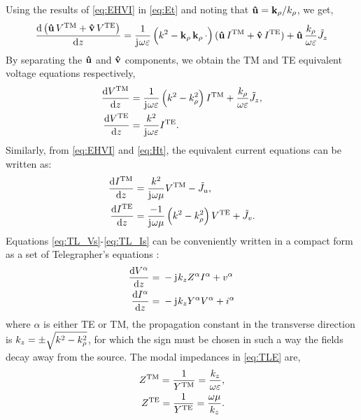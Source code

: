 \documentclass[12pt]{article}
\begin{document}
%
Using the results of \eqref{eq:EHVI} in \eqref{eq:Et} and noting that $\mathbf{\hat u} = \mathbf{k}_{\rho}/k_{\rho}$, we get,
%
\begin{equation}
  \dv{\left(\mathbf{\hat u} \, V^{\mathrm{TM}} + \mathbf{\hat v} \,V^{\mathrm{TE}} \right)}{z} = \frac{1}{\mathrm{j}\mkern1mu \omega \varepsilon}\left( k^2 - \mathbf{k}_{\rho} \,\mathbf{k}_{\rho}
  \,\cdot \right) (\mathbf{\hat u}\, I^{\mathrm{TM}} +
  \mathbf{\hat v} \, I^{\mathrm{TE}}) + \mathbf{\hat u} \, \frac{k_{\rho}}{\omega \varepsilon} \tilde{J}_z
  \label{eq:Vinuv}
\end{equation}
%
By separating the $\mathbf{\hat u}$ and $\mathbf{\hat v}$ components, we obtain the TM and TE equivalent voltage equations respectively,
%
\begin{subequations}
  \begin{align}
    \dv{V^{\mathrm{TM}}}{z} ={}&
    \frac{1}{\mathrm{j}\mkern1mu \omega \varepsilon}\left( k^2 - k_{\rho}^2 \right)I^{\mathrm{TM}} + \frac{k_{\rho}}{\omega \varepsilon} \tilde{J}_z,
    \label{eq:V_TM}\\
    \dv{V^{\mathrm{TE}}}{z} ={}&
    \frac{k^2}{\mathrm{j}\mkern1mu \omega \varepsilon} I^{\mathrm{TE}}.
    \label{eq:V_TE}
  \end{align}
  \label{eq:TL_Vs}%
\end{subequations}
%
Similarly, from \eqref{eq:EHVI} and \eqref{eq:Ht}, the equivalent current equations can be written as:
%
\begin{subequations}
  \begin{align}
    \dv{I^{\mathrm{TM}}}{z} ={}&
    \frac{k^2}{\mathrm{j}\mkern1mu \omega \mu} V^{\mathrm{TM}} - \tilde{J}_u,
    \label{eq:I_TM}\\
    \dv{I^{\mathrm{TE}}}{z} ={}&
    \frac{-1}{\mathrm{j}\mkern1mu \omega \mu}\left( k^2 - k_{\rho}^2 \right)V^{\mathrm{TE}} + \tilde{J}_v.
    \label{eq:I_TE}
  \end{align}
  \label{eq:TL_Is}%
\end{subequations}
%
Equations \eqref{eq:TL_Vs}-\eqref{eq:TL_Is} can be conveniently written in a compact form as a set of Telegrapher's equations \cite[p. 190]{felson}:
%
\begin{subequations}
  \begin{align}
    \dv{V^{\alpha}}{z} ={}& -\mathrm{j}\mkern1mu k_z Z^{\alpha}I^{\alpha} + v^{\alpha}
    \label{eq:TL_V}\\
    \dv{I^{\alpha}}{z} ={}& -\mathrm{j}\mkern1mu k_z Y^{\alpha}V^{\alpha} + i^{\alpha}
    \label{eq:TL_I}
  \end{align}
  \label{eq:telegraphers}%
\end{subequations}
%
where $\alpha$ is either TE or TM, the propagation constant in the transverse direction is $k_z = \pm \sqrt{k^2 - k_{\rho}^2}$, for which the sign must be chosen in such a way the fields decay away from the source. The modal impedances in \eqref{eq:TLE} are,
%
\begin{subequations}
  \begin{align}
    Z^{\mathrm{TM}} = \frac{1}{Y^{\mathrm{TM}}} = \frac{k_z}{\omega \varepsilon},
    \label{eq:z_TM}\\
    Z^{\mathrm{TE}} = \frac{1}{Y^{\mathrm{TE}}} = \frac{\omega \mu}{k_z}.
    \label{eq:z_TE}
  \end{align}
  \label{eq:Z}%
\end{subequations}
%
\end{document}
